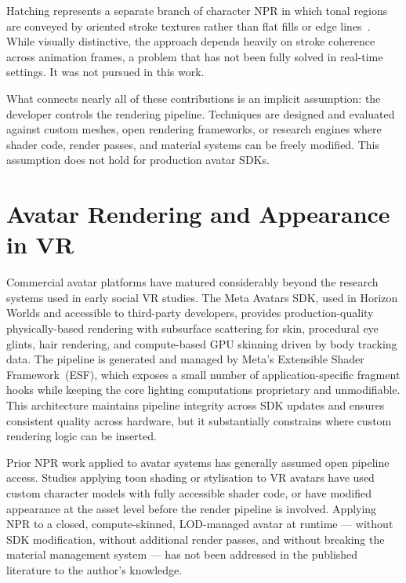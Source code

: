 Hatching represents a separate branch of character NPR in which tonal regions are conveyed by oriented stroke textures rather than flat fills or edge lines~\cite{praun2001}. While visually distinctive, the approach depends heavily on stroke coherence across animation frames, a problem that has not been fully solved in real-time settings. It was not pursued in this work.

What connects nearly all of these contributions is an implicit assumption: the developer controls the rendering pipeline. Techniques are designed and evaluated against custom meshes, open rendering frameworks, or research engines where shader code, render passes, and material systems can be freely modified. This assumption does not hold for production avatar SDKs.

\section{Avatar Rendering and Appearance in VR}
\label{sec:related_vr_avatars}

Commercial avatar platforms have matured considerably beyond the research systems used in early social VR studies. The Meta Avatars SDK, used in Horizon Worlds and accessible to third-party developers, provides production-quality physically-based rendering with subsurface scattering for skin, procedural eye glints, hair rendering, and compute-based GPU skinning driven by body tracking data. The pipeline is generated and managed by Meta's Extensible Shader Framework~(ESF), which exposes a small number of application-specific fragment hooks while keeping the core lighting computations proprietary and unmodifiable. This architecture maintains pipeline integrity across SDK updates and ensures consistent quality across hardware, but it substantially constrains where custom rendering logic can be inserted.

Prior NPR work applied to avatar systems has generally assumed open pipeline access. Studies applying toon shading or stylisation to VR avatars have used custom character models with fully accessible shader code, or have modified appearance at the asset level before the render pipeline is involved. Applying NPR to a closed, compute-skinned, LOD-managed avatar at runtime — without SDK modification, without additional render passes, and without breaking the material management system — has not been addressed in the published literature to the author's knowledge.

